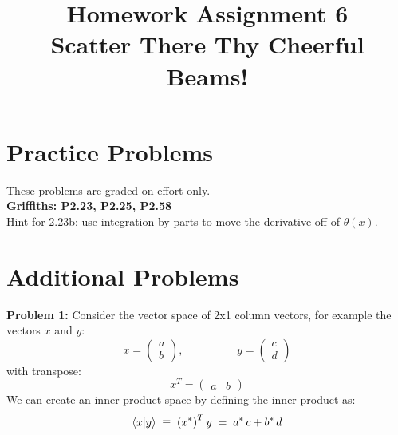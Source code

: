 \documentclass[12pt]{article}
\begin{document}
\newcommand{\ihbar}{\ensuremath{i \hbar}}
\newcommand{\dPsidt}{\ensuremath{ \frac{\partial \Psi}{\partial t} }}
\newcommand{\dPsidx}{\ensuremath{ \frac{\partial \Psi}{\partial x} }}
\newcommand{\ddPsidx}{\ensuremath{ \frac{\partial^2 \Psi}{\partial x^2} }}
\newcommand{\dPssdt}{\ensuremath{ \frac{\partial \Psi^*}{\partial t} }}
\newcommand{\dPssdx}{\ensuremath{ \frac{\partial \Psi^*}{\partial x} }}
\newcommand{\ddPssdx}{\ensuremath{ \frac{\partial^2 \Psi^*}{\partial x^2} }}

\newcommand{\dphidt}{\ensuremath{ \frac{d \phi}{dt} }}
\newcommand{\dpsidx}{\ensuremath{ \frac{d \psi}{dx} }}
\newcommand{\ddpsidx}{\ensuremath{ \frac{d^2 \psi}{dx^2} }}


\date{\vspace{-5ex}}

\title{Homework Assignment 6 \\ Scatter There Thy Cheerful Beams!}

\maketitle

\section*{Practice Problems}

These problems are graded on effort only.\\

\noindent
{\bf Griffiths: P2.23, P2.25, P2.58} \\
Hint for 2.23b:  use integration by parts to move the derivative off of $\theta(x)$.

\section*{Additional Problems}

\noindent
{\bf Problem 1:} 
Consider the vector space of 2x1 column vectors, for example the vectors $x$ and $y$:
$$x = \begin{pmatrix} a \\ b \end{pmatrix}, \hspace{2cm } y = \begin{pmatrix} c \\ d \end{pmatrix}$$
with transpose:
$$x^T = \begin{pmatrix} a & b \end{pmatrix}$$
We can create an inner product space by defining the inner product as:
$$ \braket{x|y} \; \equiv \; \left( x^* \right)^T y \; = \; a^* \, c + b^* \, d$$
\end{document}
